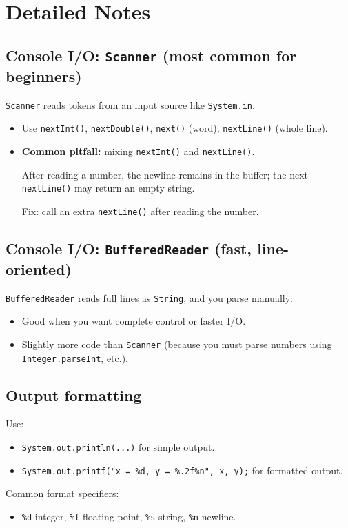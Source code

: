 \documentclass[11pt]{article}
\begin{document}
\section{Detailed Notes}
\subsection{Console I/O: \texttt{Scanner} (most common for beginners)}
\texttt{Scanner} reads tokens from an input source like \texttt{System.in}.
\begin{itemize}
  \item Use \texttt{nextInt()}, \texttt{nextDouble()}, \texttt{next()} (word), \texttt{nextLine()} (whole line).
  \item \textbf{Common pitfall:} mixing \texttt{nextInt()} and \texttt{nextLine()}.\par
  After reading a number, the newline remains in the buffer; the next \texttt{nextLine()} may return an empty string.\par
  Fix: call an extra \texttt{nextLine()} after reading the number.
\end{itemize}

\subsection{Console I/O: \texttt{BufferedReader} (fast, line-oriented)}
\texttt{BufferedReader} reads full lines as \texttt{String}, and you parse manually:
\begin{itemize}
  \item Good when you want complete control or faster I/O.
  \item Slightly more code than \texttt{Scanner} (because you must parse numbers using \texttt{Integer.parseInt}, etc.).
\end{itemize}

\subsection{Output formatting}
Use:
\begin{itemize}
  \item \texttt{System.out.println(...)} for simple output.
  \item \texttt{System.out.printf("x = \%d, y = \%.2f\%n", x, y);} for formatted output.
\end{itemize}
Common format specifiers:
\begin{itemize}
  \item \texttt{\%d} integer,\;\; \texttt{\%f} floating-point,\;\; \texttt{\%s} string,\;\; \texttt{\%n} newline.
\end{itemize}
\end{document}
